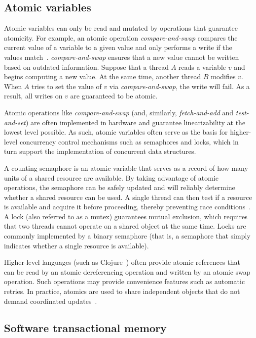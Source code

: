 \documentclass{sig-alternate}
\begin{document}
\subsection{Atomic variables}

Atomic variables can only be read and mutated by operations that guarantee atomicity. For example, an atomic operation \emph{compare-and-swap} compares the current value of a variable to a given value and only performs a write if the values match~\cite{Swalens2014}. \emph{compare-and-swap} ensures that a new value cannot be written based on outdated information. Suppose that a thread $A$ reads a variable $v$ and begins computing a new value. At the same time, another thread $B$ modifies $v$. When $A$ tries to set the value of $v$ via \emph{compare-and-swap}, the write will fail. As a result, all writes on $v$ are guaranteed to be atomic.

Atomic operations like \emph{compare-and-swap} (and, similarly, \emph{fetch-and-add} and \emph{test-and-set}) are often implemented in hardware and guarantee linearizability at the lowest level possible. As such, atomic variables often serve as the basis for higher-level concurrency control mechanisms such as semaphores and locks, which in turn support the implementation of concurrent data structures.

A counting semaphore is an atomic variable that serves as a record of how many units of a shared resource are available. By taking advantage of atomic operations, the semaphore can be safely updated and will reliably determine whether a shared resource can be used. A single thread can then test if a resource is available and acquire it before proceeding, thereby preventing race conditions~\cite{Swalens2014}. A lock (also referred to as a mutex) guarantees mutual exclusion, which requires that two threads cannot operate on a shared object at the same time. Locks are commonly implemented by a binary semaphore (that is, a semaphore that simply indicates whether a single resource is available).

Higher-level languages (such as Clojure~\cite{Swalens2014}) often provide atomic references that can be read by an atomic dereferencing operation and written by an atomic swap operation. Such operations may provide convenience features such as automatic retries. In practice, atomics are used to share independent objects that do not demand coordinated updates~\cite{Swalens2014}.

\subsection{Software transactional memory}
\end{document}
